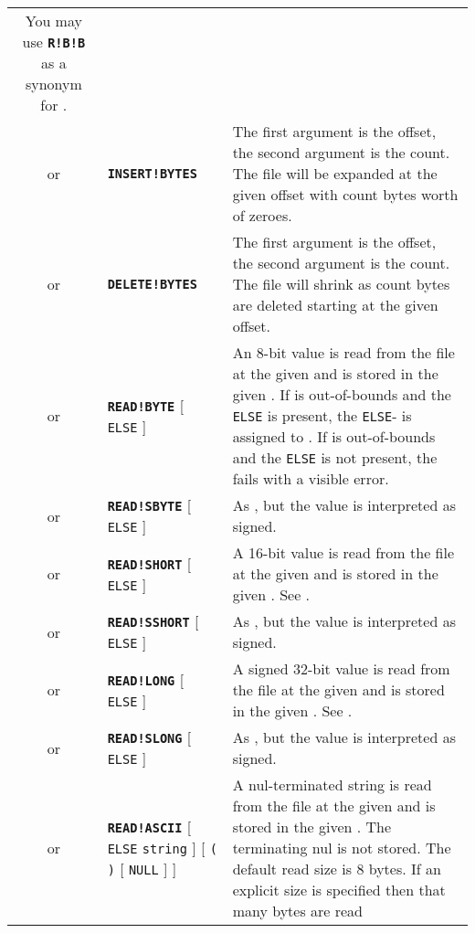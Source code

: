 \documentclass{article}
\def\ttref#1{\ahrefloc{#1}{\tt #1}}
\def\DEFINE#1{{\tt \bf #1}\label{#1}\index{#1}}
\def\t#1{{\tt #1}}
\def\Ob{{\color{red} [ }}
\def\Oe{{\color{red} ] }}
\begin{document}
\begin{tabular}{cp{10in}|p{10in}}
  You may use \DEFINE{R!B!B} as a synonym for \ttref{REPLACE!BCS!BLOCK}.
  \\
or & \DEFINE{INSERT!BYTES} \ttref{offset} \ttref{value} &
  The first argument is the offset, the second argument is the count.
  The file will be expanded at the given offset with count bytes worth of
  zeroes. \\
or & \DEFINE{DELETE!BYTES} \ttref{offset} \ttref{value} &
  The first argument is the offset, the second argument is the count.
  The file will shrink as count bytes are deleted starting at the given
  offset. \\
or & \DEFINE{READ!BYTE} \ttref{offset} \ttref{variable} \Ob \t{ELSE}
\ttref{value} \Oe &
  An 8-bit value is read from the file at the given \ttref{offset} and is stored
  in the given \ttref{variable}. If \ttref{offset} is out-of-bounds and the
  \t{ELSE} is present, the \t{ELSE}-\ttref{value} is assigned to
  \ttref{variable}. If \ttref{offset} is out-of-bounds and the \t{ELSE} is
  not present, the \ttref{patch} fails with a visible error.  \\
or & \DEFINE{READ!SBYTE} \ttref{offset} \ttref{variable} \Ob \t{ELSE}
\ttref{value} \Oe &
  As \ttref{READ!BYTE}, but the value is interpreted as signed. \\
or & \DEFINE{READ!SHORT} \ttref{offset} \ttref{variable} \Ob \t{ELSE}
\ttref{value} \Oe &
  A 16-bit value is read from the file at the given \ttref{offset} and is
  stored in the given \ttref{variable}. See \ttref{READ!BYTE}. \\
or & \DEFINE{READ!SSHORT} \ttref{offset} \ttref{variable} \Ob \t{ELSE}
\ttref{value} \Oe &
  As \ttref{READ!SHORT}, but the value is interpreted as signed. \\
or & \DEFINE{READ!LONG} \ttref{offset} \ttref{variable} \Ob \t{ELSE}
\ttref{value} \Oe &
  A signed 32-bit value is read from the file at the given \ttref{offset}
  and is stored in the given \ttref{variable}. See \ttref{READ!BYTE}. \\
or & \DEFINE{READ!SLONG} \ttref{offset} \ttref{variable} \Ob \t{ELSE}
\ttref{value} \Oe &
  As \ttref{READ!SLONG}, but the value is interpreted as signed. \\
or & \DEFINE{READ!ASCII} \ttref{offset} \ttref{variable} \Ob \t{ELSE}
  \t{string} \Oe \Ob \t{(} \ttref{value} \t{)} \Ob \t{NULL} \Oe \Oe &
    A nul-terminated string is read from the file at
    the given \ttref{offset} and is stored in the given \ttref{variable}.
    The terminating nul is not stored. The default read size is 8 bytes.
    If an explicit size \ttref{value} is specified then that many bytes are read

\end{tabular}
\end{document}
